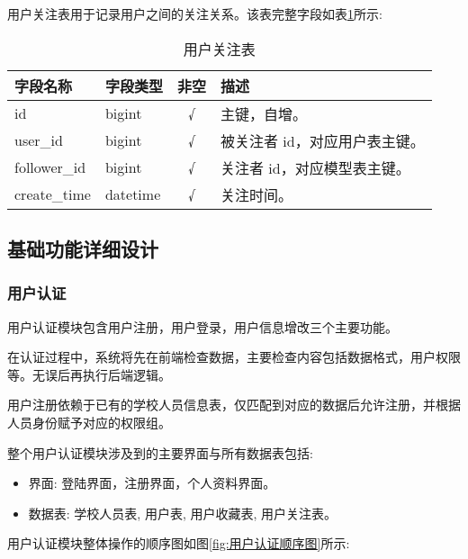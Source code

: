 用户关注表用于记录用户之间的关注关系。该表完整字段如表\ref{table:用户关注表}所示:

\begin{table}[H]
  \centering
  \small
  \caption{用户关注表}
  \label{table:用户关注表}
  \setlength{\tabcolsep}{9mm}
  \begin{tabular}{l|l|c|l}
    \toprule
    \textbf{字段名称} & \textbf{字段类型} & \textbf{非空} & \textbf{描述} \\
    \midrule
    id & bigint & √ & 主键，自增。 \\
    user\_id & bigint & √ & 被关注者 id，对应用户表主键。 \\
    follower\_id & bigint & √ & 关注者 id，对应模型表主键。 \\
    create\_time & datetime & √ & 关注时间。 \\
    \bottomrule
  \end{tabular}
\end{table}

\subsection{基础功能详细设计}

\subsubsection{用户认证}

用户认证模块包含用户注册，用户登录，用户信息增改三个主要功能。

在认证过程中，系统将先在前端检查数据，主要检查内容包括数据格式，用户权限等。无误后再执行后端逻辑。

用户注册依赖于已有的学校人员信息表，仅匹配到对应的数据后允许注册，并根据人员身份赋予对应的权限组。

整个用户认证模块涉及到的主要界面与所有数据表包括:
\begin{itemize}
  \item 界面: 登陆界面，注册界面，个人资料界面。
  \item 数据表: 学校人员表, 用户表, 用户收藏表, 用户关注表。
\end{itemize}

用户认证模块整体操作的顺序图如图\ref{fig:用户认证顺序图}所示:

